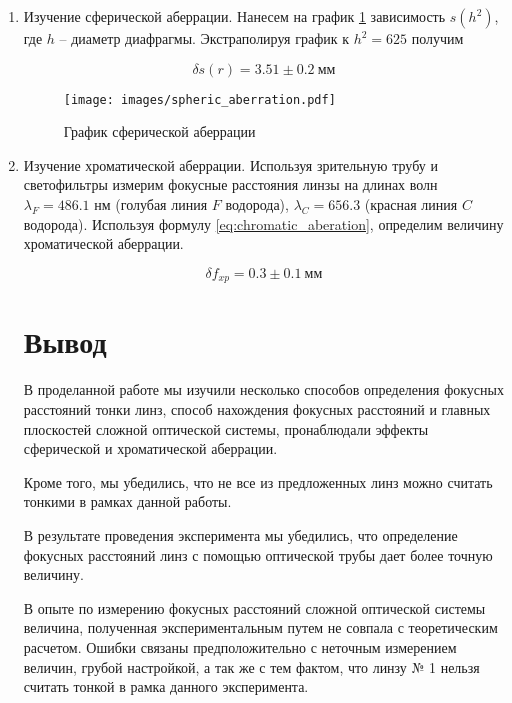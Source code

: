 \begin{enumerate}
		\item Изучение сферической аберрации. Нанесем на график \ref{fig:spheric_aberration_graph} зависимость $s(h^2)$, где $h$ -- диаметр диафрагмы. Экстраполируя график к $h^2 = 625$ получим
		
		\[ \delta s(r) = 3.51 \pm 0.2 ~ \text{мм} \]
		
		\begin{figure}
			\centering
			\texttt{[image: images/spheric\_aberration.pdf]}
			\caption{График сферической аберрации}
			\label{fig:spheric_aberration_graph}
		\end{figure}
		
		
		\item Изучение хроматической аберрации. Используя зрительную трубу и светофильтры измерим фокусные расстояния линзы на длинах волн $\lambda_F = 486.1$ нм (голубая линия $F$ водорода), $\lambda_C = 656.3$ (красная линия $C$ водорода). Используя формулу \eqref{eq:chromatic_aberation}, определим величину хроматической аберрации.
		
		\[ \delta f_{xp} = 0.3 \pm 0.1 ~ \text{мм} \] 
		
		\section*{Вывод}
		
		В проделанной работе мы изучили несколько способов определения фокусных расстояний тонки линз, способ нахождения фокусных расстояний и главных плоскостей сложной оптической системы, пронаблюдали эффекты сферической и хроматической аберрации. 
		
		Кроме того, мы убедились, что не все из предложенных линз можно считать тонкими в рамках данной работы.
		
		В результате проведения эксперимента мы убедились, что определение фокусных расстояний линз с помощью оптической трубы дает более точную величину.
		
		В опыте по измерению фокусных расстояний сложной оптической системы величина, полученная экспериментальным путем не совпала с теоретическим расчетом. Ошибки связаны предположительно с неточным измерением величин, грубой настройкой, а так же с тем фактом, что линзу № 1 нельзя считать тонкой в рамка данного эксперимента.  
		
	\end{enumerate}
	
